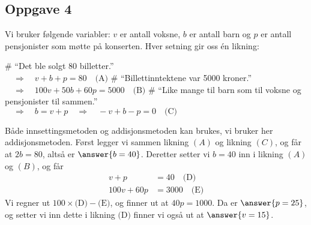 \subsection*{Oppgave 4}
Vi bruker følgende variabler: $v$ er antall voksne, $b$ er antall barn og $p$ er antall pensjonister som møtte på konserten.
Hver setning gir oss én likning:
\begin{easylist}[itemize]
	# ``Det ble solgt 80 billetter.'' \\$\quad \Rightarrow \quad v + b + p = 80 \quad \text{(A)}$
	# ``Billettinntektene var 5000 kroner.'' \\ 
	$\quad \Rightarrow \quad 100v + 50b + 60p = 5000 \quad \text{(B)}$
	# ``Like mange til barn som til voksne og pensjonister til sammen.'' \\ $\quad \Rightarrow \quad b = v + p \quad \Rightarrow \quad - v + b - p = 0 \quad \text{(C)}$
\end{easylist}
Både innsettingsmetoden og addisjonsmetoden kan brukes, vi bruker her addisjonsmetoden.
Først legger vi sammen likning $(A)$ og likning $(C)$, og får at $2b = 80$,
altså er $\answer{b=40}$.
Deretter setter vi $b = 40$ inn i likning $(A)$ og $(B)$, og får
\begin{align*}
	v + p &= 40 \quad \text{(D)}\\
	100v  + 60p &= 3000\quad \text{(E)}
\end{align*}
Vi regner ut $100 \times \text{(D)} - \text{(E)}$, og finner ut at $40p = 1000$.
Da er $\answer{p = 25}$, og setter vi inn dette i likning $\text{(D)}$ finner vi også ut at $\answer{v = 15}$.




